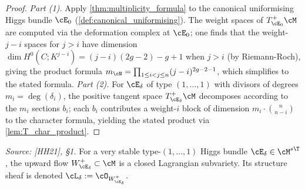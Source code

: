 \begin{proof}
  \textit{Part (1).}  Apply \cref{thm:multiplicity_formula} to the canonical uniformising Higgs
  bundle \(\cE_0\) (\cref{def:canonical_uniformising}).  The weight spaces of \(T^+_{\cE_0}\cM\)
  are computed via the deformation complex at \(\cE_0\); one finds that the weight-\(j-i\) spaces
  for \(j > i\) have dimension \(\dim H^0(C; K^{j-i}) = (j-i)(2g-2) - g + 1\) when
  \(j > i\) (by Riemann-Roch), giving the product formula
  \(m_{\cN} = \prod_{1 \leq i < j \leq n} (j-i)^{2g-2-1}\), which simplifies to the stated
  formula.
  \textit{Part (2).}  For \(\cE_\delta\) of type \((1,\ldots,1)\) with divisors of degrees
  \(m_i = \deg(\delta_i)\), the positive tangent space \(T^+_{\cE_\delta}\cM\) decomposes
  according to the \(m_i\) sections \(b_i\); each \(b_i\) contributes a weight-\(i\) block of
  dimension \(m_i \cdot \binom{n}{n-i}\) to the character formula, yielding the stated product
  via \cref{lem:T_char_product}.
\end{proof}

\begin{definition}
  \label{def:structure_sheaf_upward_flow}
  \textit{Source: [HH21], §1.}
  For a very stable type-\((1,\ldots,1)\) Higgs bundle \(\cE_\delta \in \cM^{s\T}\), the
  upward flow \(W^+_{\cE_\delta} \subset \cM\) is a closed Lagrangian subvariety.  Its
  structure sheaf is denoted \(\cL_\delta := \cO_{W^+_{\cE_\delta}}\).
\end{definition}

